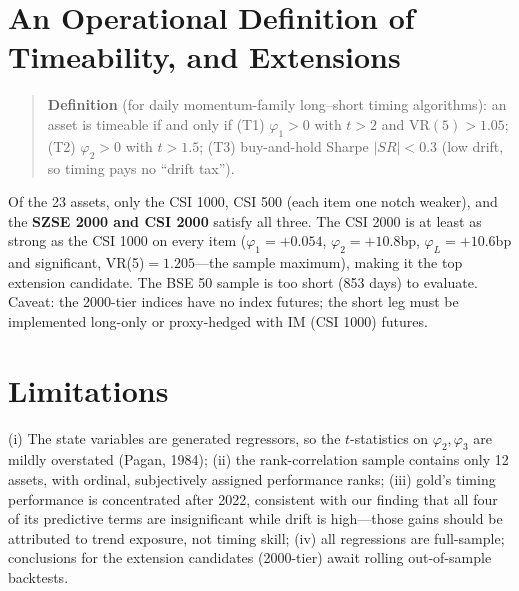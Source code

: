 \documentclass[11pt,a4paper]{article}
\begin{document}
\section{An Operational Definition of Timeability, and Extensions}
\begin{quote}
\textbf{Definition} (for daily momentum-family long--short timing algorithms): an asset is timeable if and only if
(T1) $\varphi_1>0$ with $t>2$ and $\mathrm{VR}(5)>1.05$;
(T2) $\varphi_2>0$ with $t>1.5$;
(T3) buy-and-hold Sharpe $|SR|<0.3$ (low drift, so timing pays no ``drift tax'').
\end{quote}
Of the 23 assets, only the CSI 1000, CSI 500 (each item one notch weaker), and the \textbf{SZSE 2000 and CSI 2000} satisfy all three. The CSI 2000 is at least as strong as the CSI 1000 on every item ($\varphi_1=+0.054$, $\varphi_2=+10.8$bp, $\varphi_L=+10.6$bp and significant, VR(5)$=1.205$---the sample maximum), making it the top extension candidate. The BSE 50 sample is too short (853 days) to evaluate. Caveat: the 2000-tier indices have no index futures; the short leg must be implemented long-only or proxy-hedged with IM (CSI 1000) futures.

\section{Limitations}
(i) The state variables are generated regressors, so the $t$-statistics on $\varphi_2,\varphi_3$ are mildly overstated (Pagan, 1984); (ii) the rank-correlation sample contains only 12 assets, with ordinal, subjectively assigned performance ranks; (iii) gold's timing performance is concentrated after 2022, consistent with our finding that all four of its predictive terms are insignificant while drift is high---those gains should be attributed to trend exposure, not timing skill; (iv) all regressions are full-sample; conclusions for the extension candidates (2000-tier) await rolling out-of-sample backtests.
\end{document}
